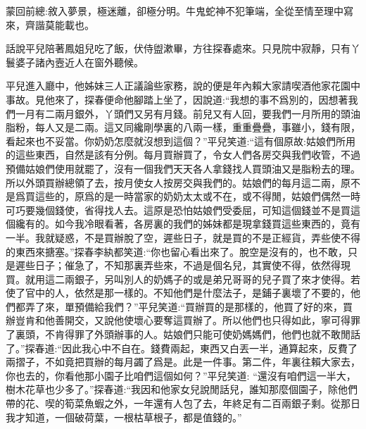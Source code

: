 

\begin{parag}
    \begin{note}蒙回前總:敘入夢景，極迷離，卻極分明。牛鬼蛇神不犯筆端，全從至情至理中寫來，齊諧莫能載也。\end{note}
\end{parag}


\begin{parag}
    話說平兒陪著鳳姐兒吃了飯，伏侍盥漱畢，方往探春處來。只見院中寂靜，只有丫鬟婆子諸內壼近人在窗外聽候。
\end{parag}


\begin{parag}
    平兒進入廳中，他姊妹三人正議論些家務，說的便是年內賴大家請喫酒他家花園中事故。見他來了，探春便命他腳踏上坐了，因說道:“我想的事不爲別的，因想著我們一月有二兩月銀外，丫頭們又另有月錢。前兒又有人回，要我們一月所用的頭油脂粉，每人又是二兩。這又同纔剛學裏的八兩一樣，重重疊疊，事雖小，錢有限，看起來也不妥當。你奶奶怎麼就沒想到這個？”平兒笑道:“這有個原故:姑娘們所用的這些東西，自然是該有分例。每月買辦買了，令女人們各房交與我們收管，不過預備姑娘們使用就罷了，沒有一個我們天天各人拿錢找人買頭油又是脂粉去的理。所以外頭買辦總領了去，按月使女人按房交與我們的。姑娘們的每月這二兩，原不是爲買這些的，原爲的是一時當家的奶奶太太或不在，或不得閒，姑娘們偶然一時可巧要幾個錢使，省得找人去。這原是恐怕姑娘們受委屈，可知這個錢並不是買這個纔有的。如今我冷眼看著，各房裏的我們的姊妹都是現拿錢買這些東西的，竟有一半。我就疑惑，不是買辦脫了空，遲些日子，就是買的不是正經貨，弄些使不得的東西來搪塞。”探春李紈都笑道:“你也留心看出來了。脫空是沒有的，也不敢，只是遲些日子；催急了，不知那裏弄些來，不過是個名兒，其實使不得，依然得現買。就用這二兩銀子，另叫別人的奶媽子的或是弟兄哥哥的兒子買了來才使得。若使了官中的人，依然是那一樣的。不知他們是什麼法子，是鋪子裏壞了不要的，他們都弄了來，單預備給我們？”平兒笑道:“買辦買的是那樣的，他買了好的來，買辦豈肯和他善開交，又說他使壞心要奪這買辦了。所以他們也只得如此，寧可得罪了裏頭，不肯得罪了外頭辦事的人。姑娘們只能可使奶媽媽們，他們也就不敢閒話了。”探春道:“因此我心中不自在。錢費兩起，東西又白丟一半，通算起來，反費了兩摺子，不如竟把買辦的每月蠲了爲是。此是一件事。第二件，年裏往賴大家去，你也去的，你看他那小園子比咱們這個如何？”平兒笑道: “還沒有咱們這一半大，樹木花草也少多了。”探春道:“我因和他家女兒說閒話兒，誰知那麼個園子，除他們帶的花、喫的筍菜魚蝦之外，一年還有人包了去，年終足有二百兩銀子剩。從那日我才知道，一個破荷葉，一根枯草根子，都是值錢的。”
\end{parag}


